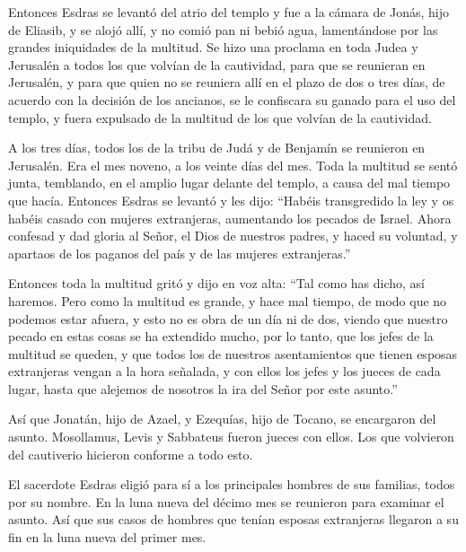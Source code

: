  Entonces Esdras se levantó del atrio del templo y fue a
la cámara de Jonás, hijo de Eliasib,  y se alojó allí, y
no comió pan ni bebió agua, lamentándose por las grandes iniquidades de
la multitud.  Se hizo una proclama en toda Judea y
Jerusalén a todos los que volvían de la cautividad, para que se
reunieran en Jerusalén,  y para que quien no se reuniera
allí en el plazo de dos o tres días, de acuerdo con la decisión de los
ancianos, se le confiscara su ganado para el uso del templo, y fuera
expulsado de la multitud de los que volvían de la cautividad.

 A los tres días, todos los de la tribu de Judá y de
Benjamín se reunieron en Jerusalén. Era el mes noveno, a los veinte días
del mes.  Toda la multitud se sentó junta, temblando, en
el amplio lugar delante del templo, a causa del mal tiempo que hacía.
 Entonces Esdras se levantó y les dijo: ``Habéis
transgredido la ley y os habéis casado con mujeres extranjeras,
aumentando los pecados de Israel.  Ahora confesad y dad
gloria al Señor, el Dios de nuestros padres,  y haced su
voluntad, y apartaos de los paganos del país y de las mujeres
extranjeras.''

 Entonces toda la multitud gritó y dijo en voz alta:
``Tal como has dicho, así haremos.  Pero como la multitud
es grande, y hace mal tiempo, de modo que no podemos estar afuera, y
esto no es obra de un día ni de dos, viendo que nuestro pecado en estas
cosas se ha extendido mucho,  por lo tanto, que los jefes
de la multitud se queden, y que todos los de nuestros asentamientos que
tienen esposas extranjeras vengan a la hora señalada,  y
con ellos los jefes y los jueces de cada lugar, hasta que alejemos de
nosotros la ira del Señor por este asunto.''

 Así que Jonatán, hijo de Azael, y Ezequías, hijo de
Tocano, se encargaron del asunto. Mosollamus, Levis y Sabbateus fueron
jueces con ellos.  Los que volvieron del cautiverio
hicieron conforme a todo esto.

 El sacerdote Esdras eligió para sí a los principales
hombres de sus familias, todos por su nombre. En la luna nueva del
décimo mes se reunieron para examinar el asunto.  Así que
sus casos de hombres que tenían esposas extranjeras llegaron a su fin en
la luna nueva del primer mes.

